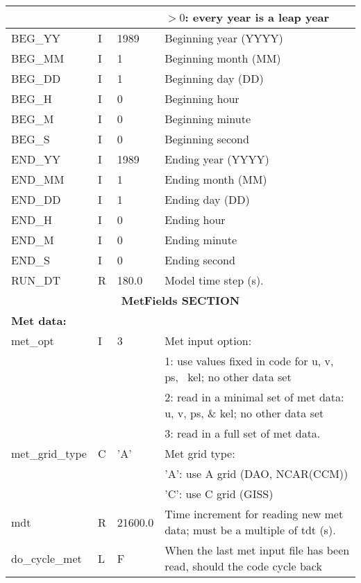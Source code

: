 {\begin{landscape}
\begin{center}
\begin{longtable}{|l|l|l|l|}
                 &      &           & $>0$: every year is a leap year  \\ \hline
%
BEG\_YY  & I & 1989 & Beginning year  (YYYY) \\ \hline
BEG\_MM  & I &    1 & Beginning month (MM)   \\ \hline
BEG\_DD  & I &    1 & Beginning day   (DD)   \\ \hline
BEG\_H   & I &    0 & Beginning hour         \\ \hline
BEG\_M   & I &    0 & Beginning minute       \\ \hline
BEG\_S   & I &    0 & Beginning second       \\ \hline
%
END\_YY  & I & 1989 & Ending year  (YYYY) \\ \hline
END\_MM  & I &    1 & Ending month (MM)   \\ \hline
END\_DD  & I &    1 & Ending day   (DD)   \\ \hline
END\_H   & I &    0 & Ending hour         \\ \hline
END\_M   & I &    0 & Ending minute       \\ \hline
END\_S   & I &    0 & Ending second       \\ \hline
%
RUN\_DT  & R    &  180.0     &   Model time step      (s).  \\ \hline\hline
%
%
\multicolumn{4}{|c|}{\bf MetFields SECTION} \\ \hline\hline
\multicolumn{4}{|l|}{\bf Met data:} \\ \hline
met\_opt        & I    &    3    & Met input option:  \\
                &      &         & 1: use values fixed in code for u, v, ps, \ kel; no other data set  \\
                &      &         & 2: read in a minimal set of met data: u, v, ps, \& kel; no other data set  \\
                &      &         & 3:  read in a full set of met data.  \\ \hline
met\_grid\_type & C    &  'A'    & Met grid type:  \\
                &      &         & 'A':  use A grid (DAO, NCAR(CCM))  \\
                &      &         & 'C':  use C grid (GISS)  \\ \hline
mdt             & R    & 21600.0 & Time increment for reading new met data; must be a multiple of tdt (s).  \\ \hline
do\_cycle\_met  & L    & F       & When the last met input file has been read, should the code cycle back \\

\end{longtable}
\end{center}
\end{landscape}}
